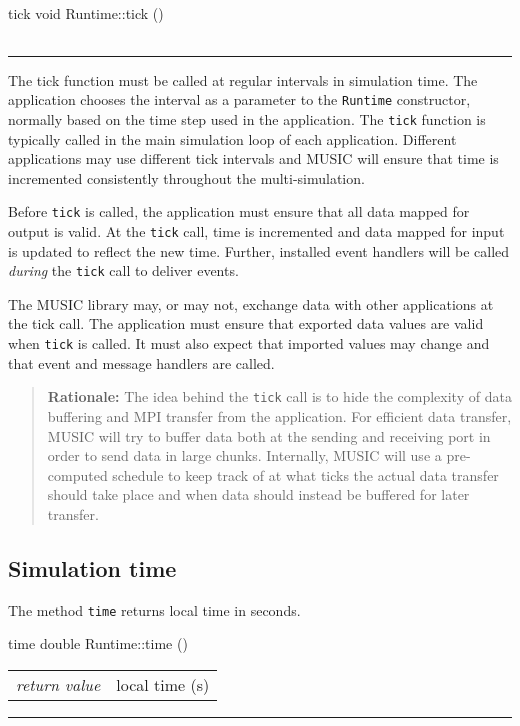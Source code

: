 \documentclass[a4paper,twoside]{report}
\makeatletter
\newenvironment{rationale}%
{\par\begin{quote}\textbf{Rationale:}}%
{\par\end{quote}}
\newenvironment{parameters}%
{\begin{tabular}{@{\hspace{2em}}lp{0.6\textwidth}}}%
{\end{tabular}\par\vspace{1mm}\par\hrule\par\vspace{5mm}}
\makeatother
\begin{document}
\begin{head}{tick}
  void Runtime::tick ()
\end{head}
\begin{parameters}
\end{parameters}

The tick function must be called at regular intervals in simulation
time.  The application chooses the interval as a parameter to the
\lstinline|Runtime| constructor, normally based on the time step used
in the application.  The \lstinline|tick| function is typically called
in the main simulation loop of each application.  Different
applications may use different tick intervals and MUSIC will ensure
that time is incremented consistently throughout the multi-simulation.

Before \lstinline|tick| is called, the application must ensure that
all data mapped for output is valid.  At the \lstinline|tick| call,
time is incremented and data mapped for input is updated to reflect
the new time.  Further, installed event handlers will be called
\emph{during} the \lstinline|tick| call to deliver events.

The MUSIC library may, or may not, exchange data with other
applications at the tick call.  The application must ensure that
exported data values are valid when \lstinline|tick| is called.  It
must also expect that imported values may change and that event and
message handlers are called.

\begin{rationale}
  The idea behind the \lstinline|tick| call is to hide the complexity
  of data buffering and MPI transfer from the application.  For
  efficient data transfer, MUSIC will try to buffer data both at the
  sending and receiving port in order to send data in large chunks.
  Internally, MUSIC will use a pre-computed schedule to keep track of
  at what ticks the actual data transfer should take place and when
  data should instead be buffered for later transfer.
\end{rationale}


\subsection{Simulation time}

The method \lstinline|time| returns local time in seconds.

\begin{head}{time}
  double Runtime::time ()
\end{head}
\begin{parameters}
  \emph{return value} & local time (s) \\
\end{parameters}
\end{document}
